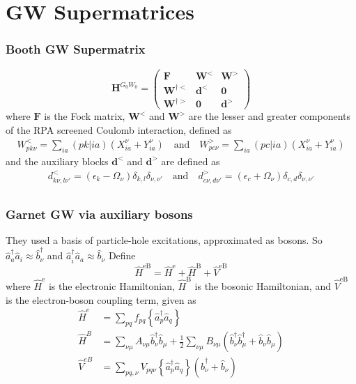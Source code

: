 
\section{GW Supermatrices}
\begin{frame}
    \frametitle{Booth GW Supermatrix}

\begin{equation}
    \bm{H}^{G_0 W_0} = \begin{pmatrix} \bm{F} & \bm{W}^< & \bm{W}^> \\ \bm{W}^{\dagger<} & \bm{d}^< & \bm{0} \\ \bm{W}^{\dagger>} & \bm{0} & \bm{d}^> \end{pmatrix}
\end{equation}
where $\bm{F}$ is the Fock matrix, $\bm{W}^<$ and $\bm{W}^>$ are the lesser and greater components of the RPA screened Coulomb interaction, defined as
\begin{equation}
\begin{split}
    W_{pk\nu}^{<} = \sum_{ia} (pk|ia) \left( X_{ia}^{\nu} + Y_{ia}^{\nu} \right) \quad \text{and} \quad W_{pc\nu}^{>} = \sum_{ia} (pc|ia) \left( X_{ia}^{\nu} + Y_{ia}^{\nu} \right)
\end{split}
\end{equation}
and the auxiliary blocks $\bm{d}^<$ and $\bm{d}^>$ are defined as
\begin{equation}
\begin{split}
    d_{k\nu,l\nu'}^{<} = \left(\epsilon_k - \Omega_\nu\right) \delta_{k,l} \delta_{\nu,\nu'}\quad \text{and} \quad
    d_{c\nu,d\nu'}^{>} = \left(\epsilon_c + \Omega_\nu\right) \delta_{c,d} \delta_{\nu,\nu'}\\
\end{split}
\end{equation}

\end{frame}

\begin{frame}
    \frametitle{Garnet GW via auxiliary bosons}
They used a basis of particle-hole excitations, approximated as bosons. So $\hat{a}_a^\dagger \hat{a}_i \approx \hat{b}_\nu^\dag$ and $\hat{a}_i^\dagger \hat{a}_a \approx \hat{b}_\nu$
Define \begin{equation}
\hat{H}^{\mathrm{eB}}=\hat{H}^{\mathrm{e}}+\hat{H}^{\mathrm{B}}+\hat{V}^{\mathrm{eB}}
\end{equation}
where $\hat{H}^{\mathrm{e}}$ is the electronic Hamiltonian, $\hat{H}^{\mathrm{B}}$ is the bosonic Hamiltonian, and $\hat{V}^{\mathrm{eB}}$ is the electron-boson coupling term, given as
\begin{align}
\hat{H}^e&=\sum_{p q} f_{p q}\left\{\hat{a}_p^{\dagger} \hat{a}_q\right\} \\
\hat{H}^{B}&=\sum_{\nu \mu} A_{\nu \mu} \hat{b}_\nu^{\dagger} \hat{b}_\mu+\frac{1}{2} \sum_{\nu \mu} B_{\nu \mu}\left(\hat{b}_\nu^{\dagger} \hat{b}_\mu^{\dagger}+\hat{b}_\nu \hat{b}_\mu\right)
\label{b} \\
\hat{V}^{eB}&=\sum_{p q, \nu} V_{p q \nu}\left\{\hat{a}_p^{\dagger} \hat{a}_q\right\}\left(\hat{b}_\nu^{\dagger}+\hat{b}_\nu\right)
\label{eb}
\end{align}
\end{frame}

